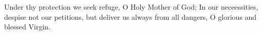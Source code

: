 \begin{enpars}\noindent Under thy protection we seek refuge, O Holy Mother of God;
In our neceessities, despise not our petitions,
but deliver us always from all dangers,
O glorious and blessed Virgin.
\end{enpars}